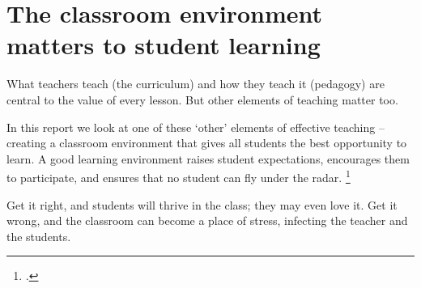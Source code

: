 \documentclass[FrontPage]{grattan}
\begin{document}
\contentspage

\chapter{The classroom environment matters to student learning}\label{chap:classroom-environment-matters}

What teachers teach (the curriculum) and how they teach it (pedagogy) are central to the value of every lesson. But other elements of teaching matter too.
 
In this report we look at one of these `other' elements of effective teaching – creating a classroom environment that gives all students the best opportunity to learn. A good learning environment raises student expectations, encourages them to participate, and ensures that no student can fly under the radar.%
    \footcites{Evertson2006ClassroomManagementField}{Jones2004ComprehensiveClassroomManagement}{Marzano2003ClassroomManagementWorks}{McDonald2013ClassroomManagementEngaging}{Porter2007StudentBehaviourTheory}
 
Get it right, and students will thrive in the class; they may even love it. Get it wrong, and the classroom can become a place of stress, infecting the teacher and the students. 
\end{document}
